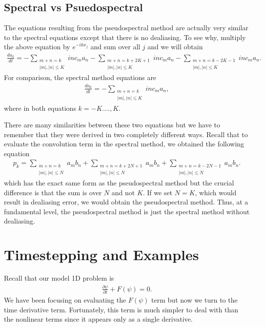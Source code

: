 \subsection{Spectral vs Psuedospectral}
The equations resulting from the pseudospectral method are actually very similar to the spectral equations except that there is no dealiasing. To see why, multiply the above equation by $e^{-ikx_{j}}$ and sum over all $j$ and we will obtain
\begin{align}
\frac{da_{k}}{dt}= -\sum_{\substack{m+n=k\\ |m|,|n|\le K}}inc_{m}a_{n}-\sum_{\substack{m+n=k+2K+1\\ |m|,|n|\le K}}inc_{m}a_{n}- \sum_{\substack{m+n=k-2K-1\\ |m|,|n|\le K}}inc_{m}a_{n}.
\end{align}
For comparison, the spectral method equations are
\begin{align} 
\frac{da_{k}}{dt} = -\sum_{\substack{m+n=k\\ |m|,|n|\le K}} inc_{m}a_{n},
\end{align}
where in both equations $k=-K.\ldots,K$. 

There are many similarities between these two equations but we have to remember that they were derived in two completely different ways. Recall that to evaluate the convolution term in the spectral method, we obtained the following equation
\begin{align}
p_{k} = \sum_{\substack{m+n=k\\ |m|,|n|\le N}}a_{m}b_{n}+  \sum_{\substack{m+n=k+2N+1\\ |m|,|n|\le N}}a_{m}b_{n}+ \sum_{\substack{m+n=k-2N-1\\ |m|,|n|\le N}}a_{m}b_{n}.
\end{align}
which has the exact same form as the pseudospectral method but the crucial difference is that the sum is over $N$ and not $K$. If we set $N=K$, which would result in dealiasing error, we would obtain the pseudospectral method. Thus, at a fundamental level, the pseudospectral method is just the spectral method without dealiasing.

\section{Timestepping and Examples}
Recall that our model 1D problem is 
\begin{align}
\frac{\partial \psi}{\partial t} + F(\psi) = 0.
\end{align}
We have been focusing on evaluating the $F(\psi)$ term but now we turn to the time derivative term. Fortunately, this term is much simpler to deal with than the nonlinear terms since it appears only as a single derivative. 

